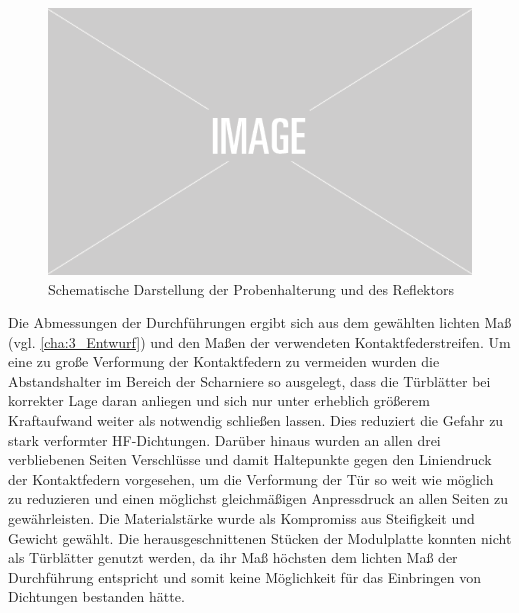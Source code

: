 \begin{figure}[ht]
    \centering
    \includegraphics[width=.6\textwidth]{Abbildungen/placeholder.png}
    \caption{Schematische Darstellung der Probenhalterung und des Reflektors}
    \label{fig:3_Probenhalterung_und_Reflektor}
\end{figure}
    



Die Abmessungen der Durchführungen ergibt sich aus dem gewählten lichten Maß (vgl. \Abschnitt\ref{cha:3_Entwurf}) und den Maßen der verwendeten Kontaktfederstreifen. Um eine zu große Verformung der Kontaktfedern zu vermeiden wurden die Abstandshalter im Bereich der Scharniere so ausgelegt, dass die Türblätter bei korrekter Lage daran anliegen und sich nur unter erheblich größerem Kraftaufwand weiter als notwendig schließen lassen. Dies reduziert die Gefahr zu stark verformter HF-Dichtungen. Darüber hinaus wurden an allen drei verbliebenen Seiten Verschlüsse und damit Haltepunkte gegen den Liniendruck der Kontaktfedern vorgesehen, um die Verformung der Tür so weit wie möglich zu reduzieren und einen möglichst gleichmäßigen Anpressdruck an allen Seiten zu gewährleisten. Die Materialstärke wurde als Kompromiss aus Steifigkeit und Gewicht gewählt. Die herausgeschnittenen Stücken der Modulplatte konnten nicht als Türblätter genutzt werden, da ihr Maß höchsten dem lichten Maß der Durchführung entspricht und somit keine Möglichkeit für das Einbringen von Dichtungen bestanden hätte.
\par
\vspace{\linespace}



